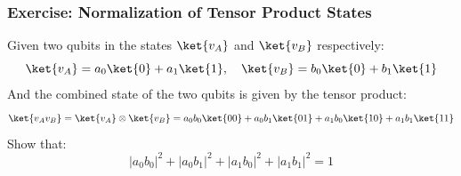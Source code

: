 \subsubsection{Exercise: Normalization of Tensor Product States}

Given two qubits in the states $\ket{v_{A}}$ and $\ket{v_{B}}$ respectively:
\begin{equation*}
    \ket{v_{A}} = a_{0}\ket{0} + a_{1}\ket{1}, \quad \ket{v_{B}} = b_{0}\ket{0} + b_{1}\ket{1}
\end{equation*}
And the combined state of the two qubits is given by the tensor product:
\begin{equation*}
    \ket{v_{A}v_{B}} = \ket{v_{A}} \otimes \ket{v_{B}} = a_{0}b_{0}\ket{00} + a_{0}b_{1}\ket{01} + a_{1}b_{0}\ket{10} + a_{1}b_{1}\ket{11}
\end{equation*}
Show that:
\begin{equation*}
    \left|a_0 b_0\right|^2 + \left|a_0 b_1\right|^2 + \left|a_1 b_0\right|^2 + \left|a_1 b_1\right|^2 = 1
\end{equation*}

